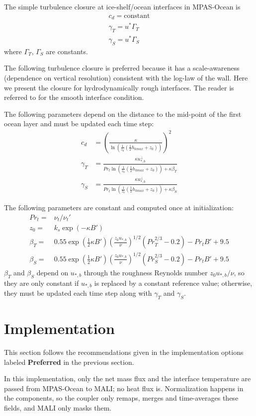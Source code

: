 \documentclass[11pt]{report}
\newcommand{\bea}{\begin{eqnarray}}
\newcommand{\eea}{\end{eqnarray}}
\begin{document}
The simple turbulence closure at ice-shelf/ocean interfaces in MPAS-Ocean is
\bea
    c_d = \text{constant}\\
    \gamma_T = u^* \Gamma_T\\
    \gamma_S = u^* \Gamma_S
\eea
where $\Gamma_T$, $\Gamma_S$ are constants.

The following turbulence closure is preferred because it has a scale-awareness (dependence on vertical resolution) consistent with the log-law of the wall. Here we present the closure for hydrodynamically rough interfaces. The reader is referred to \cite{burchard_vertical_2022} for the smooth interface condition.

The following parameters depend on the distance to the mid-point of the first ocean layer and must be updated each time step:
\bea
    c_d &= (\frac{\kappa}{\ln(\frac{1}{z_0}(\frac{1}{2}h_{kmax} + z_0))})^2\\
    \gamma_T &= \frac{\kappa u^{\perp}_{*,b}}{Pr_t \ln(\frac{1}{z_0}(\frac{1}{2}h_{kmax} + z_0))+\kappa \beta_T}\\
    \gamma_S &= \frac{\kappa u^{\perp}_{*,b}}{Pr_t \ln(\frac{1}{z_0}(\frac{1}{2}h_{kmax} + z_0))+\kappa \beta_S}
\eea

The following parameters are constant and computed once at initialization:
\bea
    Pr_t =& \nu_t / \nu_t'\\
    z_0 =& k_s \exp{(-\kappa B')}\\
    \beta_T =& 0.55 \exp{(\frac{1}{2}\kappa B')}(\frac{z_0 u_{*,b}}{\nu})^{1/2}(Pr_T^{2/3} - 0.2) - Pr_t B' + 9.5\\
    \beta_S =& 0.55 \exp{(\frac{1}{2}\kappa B')}(\frac{z_0 u_{*,b}}{\nu})^{1/2}(Pr_S^{2/3} - 0.2) - Pr_t B' + 9.5
\eea
$\beta_T$ and $\beta_S$ depend on $u_{*,b}$ through the roughness Reynolds number $z_0 u_{*,b}/\nu$, so they are only constant if $u_{*,b}$ is replaced by a constant reference value; otherwise, they must be updated each time step along with $\gamma_T$ and $\gamma_S$.

\section{Implementation}

This section follows the recommendations given in the implementation options labeled \textbf{Preferred} in the previous section.

In this implementation, only the net mass flux and the interface temperature are passed from MPAS-Ocean to MALI; no heat flux is.  Normalization happens in the components, so the coupler only remaps, merges and time-averages these fields, and MALI only masks them.
\end{document}
